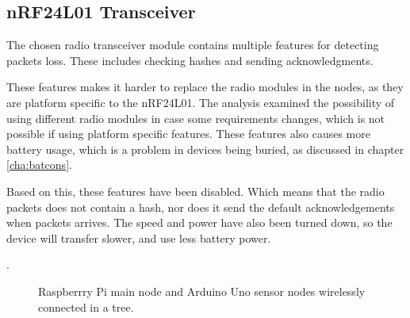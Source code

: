 \subsection{nRF24L01 Transceiver}
The chosen radio transceiver module contains multiple features for detecting packets loss. These includes checking hashes and sending acknowledgments\cite{nf24datasheet}.

These features makes it harder to replace the radio modules in the nodes, as they are platform specific to the nRF24L01. The analysis examined the possibility of using different radio modules in case some requirements changes, which is not possible if using platform specific features. These features also causes more battery usage, which is a problem in devices being buried, as discussed in chapter \ref{cha:batcons}.

Based on this, these features have been disabled. Which means that the radio packets does not contain a hash, nor does it send the default acknowledgements when packets arrives. The speed and power have also been turned down, so the device will transfer slower, and use less battery power.

.

\begin{figure}[!h]
	\centering
	\caption{Raspberrry Pi main node and Arduino Uno sensor nodes wirelessly connected in a tree.}
	\label{fig:raspbuinoTree}
\end{figure}
